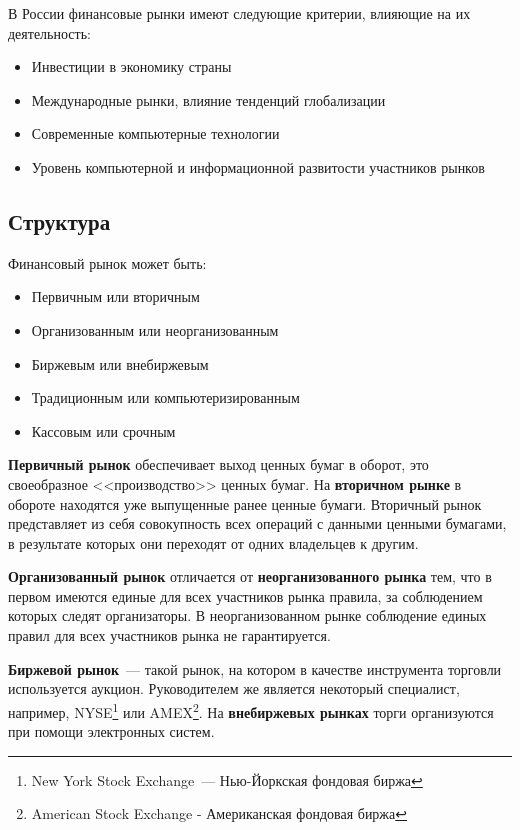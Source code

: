 \documentclass[14pt]{matmex-diploma-custom}
\begin{document}
В России финансовые рынки имеют следующие критерии, влияющие на их деятельность:

\begin{itemize}
\item Инвестиции в экономику страны
\item Международные рынки, влияние тенденций глобализации
\item Современные компьютерные технологии
\item Уровень компьютерной и информационной развитости участников рынков
\end{itemize}

\subsection{Структура}

Финансовый рынок может быть:

\begin{itemize}
\item Первичным или вторичным
\item Организованным или неорганизованным
\item Биржевым или внебиржевым
\item Традиционным или компьютеризированным
\item Кассовым или срочным
\end{itemize}

\textbf{Первичный рынок} обеспечивает выход ценных бумаг в оборот, это своеобразное <<производство>> ценных бумаг. На \textbf{вторичном рынке} в обороте находятся уже выпущенные ранее ценные бумаги. Вторичный рынок представляет из себя совокупность всех операций с данными ценными бумагами, в результате которых они переходят от одних владельцев к другим.

\textbf{Организованный рынок} отличается от \textbf{неорганизованного рынка} тем, что в первом имеются единые для всех участников рынка правила, за соблюдением которых следят организаторы. В неорганизованном рынке соблюдение единых правил для всех участников рынка не гарантируется.

\textbf{Биржевой рынок}~--- такой рынок, на котором в качестве инструмента торговли используется аукцион. Руководителем же является некоторый специалист, например, NYSE\footnote{New York Stock Exchange~--- Нью-Йоркская фондовая биржа} или AMEX\footnote{American Stock Exchange - Американская фондовая биржа}. На \textbf{внебиржевых рынках} торги организуются при помощи электронных систем.
\end{document}
